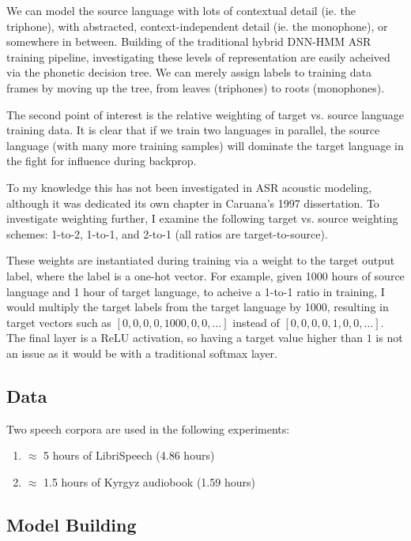\documentclass[a4paper]{article}
\begin{document}
We can model the source language with lots of contextual detail (ie. the triphone), with abstracted, context-independent detail (ie. the monophone), or somewhere in between. Building of the traditional hybrid DNN-HMM ASR training pipeline, investigating these levels of representation are easily acheived via the phonetic decision tree. We can merely assign labels to training data frames by moving up the tree, from leaves (triphones) to roots (monophones).

The second point of interest is the relative weighting of target vs. source language training data. It is clear that if we train two languages in parallel, the source language (with many more training samples) will dominate the target language in the fight for influence during backprop.

To my knowledge this has not been investigated in ASR acoustic modeling, although it was dedicated its own chapter in Caruana's 1997 dissertation. To investigate weighting further, I examine the following target vs. source weighting schemes: 1-to-2, 1-to-1, and 2-to-1 (all ratios are target-to-source).

These weights are instantiated during training via a weight to the target output label, where the label is a one-hot vector. For example, given 1000 hours of source language and 1 hour of target language, to acheive a 1-to-1 ratio in training, I would multiply the target labels from the target language by 1000, resulting in target vectors such as \texttt{$[0, 0, 0, 0, 1000, 0, 0, \ldots]$} instead of \texttt{$[0, 0, 0, 0, 1, 0, 0, \ldots]$}. The final layer is a ReLU activation, so having a target value higher than $1$ is not an issue as it would be with a traditional softmax layer.



\subsection{Data}

Two speech corpora are used in the following experiments:

\begin{enumerate}
\item $\approx$ 5 hours of LibriSpeech (4.86 hours)
\item $\approx$ 1.5 hours of Kyrgyz audiobook (1.59 hours)
\end{enumerate}

\subsection{Model Building}
\end{document}
